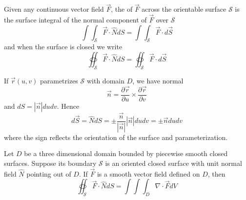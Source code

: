 \begin{appendices}
    
    \begin{defn}
        Given any continuous vector field $\vec{F}$, the  of $\vec{F}$ across the orientable surface $\mathcal{S}$ is the surface integral of the normal component of $\vec{F}$ over $\mathcal{S}$ \begin{equation}
            \int\int_{\mathcal{S}}\vec{F}\cdot \hat{N}dS = \int\int_{\mathcal{S}}\vec{F}\cdot d\vec{S}
        \end{equation}
        and when the surface is closed we write \begin{equation}
            \oiint_{\mathcal{S}}\vec{F}\cdot \hat{N}dS = \oiint_{\mathcal{S}}\vec{F}\cdot d\vec{S}
        \end{equation}
    \end{defn}
    
    
    \begin{rmk}
        If $\vec{r}(u,v)$ parametrizes $\mathcal{S}$ with domain $D$, we have normal \begin{equation}
            \vec{n} = \frac{\partial \vec{r}}{\partial u}\times \frac{\partial \vec{r}}{\partial v}
        \end{equation}
        and $dS = |\vec{n}|dudv$. Hence \begin{equation}
            d\vec{S} = \hat{N}dS = \pm\frac{\vec{n}}{|\vec{n}|}|\vec{n}|dudv = \pm\vec{n}dudv
        \end{equation}
        where the sign reflects the orientation of the surface and parameterization.
    \end{rmk}
    
    \begin{namthm}
        Let $D$ be a three dimensional domain bounded by piecewise smooth closed surfaces. Suppose its boundary $\mathcal{S}$ is an oriented closed surface with unit normal field $\hat{N}$ pointing out of $D$. If $\vec{F}$ is a smooth vector field defined on $D$, then \begin{equation}
            \oiint_{\mathcal{S}}\vec{F}\cdot \hat{N}dS = \int\int\int_D\nabla\cdot \vec{F}dV
        \end{equation}
    \end{namthm}
    
\end{appendices}